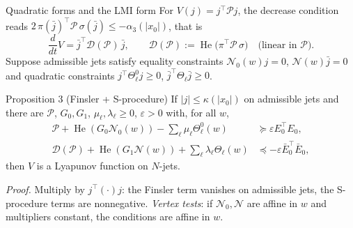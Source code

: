\documentclass[10pt,aspectratio=169]{beamer}
\newcommand{\tr}{^{\top}}
\newcommand{\PP}{\mathcal{P}}
\newcommand{\DD}{\mathcal{D}}
\newcommand{\NN}{\mathcal{N}}
\DeclareMathOperator{\He}{He}
\begin{document}
\begin{frame}{Quadratic forms and the LMI form}
For $V(j)=j\tr\PP j$, the decrease condition reads $2\,\pi(\bar j)\tr\PP\,\sigma(\bar j)\le-\alpha_3(|x_0|)$, that is
\[
\frac{d}{dt}V=\bar j\tr\DD(\PP)\,\bar j,\qquad \DD(\PP):=\He\big(\pi\tr\PP\,\sigma\big)\quad\text{(linear in }\PP).
\]
Suppose admissible jets satisfy equality constraints $\NN_0(w)j=0$, $\NN(w)\bar j=0$ and quadratic constraints $j\tr\Theta^0_\ell j\ge0$, $\bar j\tr\Theta_\ell \bar j\ge0$.
\begin{block}{Proposition 3 (Finsler + S-procedure)}
If $|j|\le\kappa(|x_0|)$ on admissible jets and there are $\PP$, $G_0,G_1$, $\mu_\ell,\lambda_\ell\ge0$, $\varepsilon>0$ with, for all $w$,
\begin{align*}
\PP+\He(G_0\NN_0(w))-\textstyle\sum_\ell\mu_\ell\Theta^0_\ell(w)&\succeq\varepsilon E_0\tr E_0,\\
\DD(\PP)+\He(G_1\NN(w))+\textstyle\sum_\ell\lambda_\ell\Theta_\ell(w)&\preceq-\varepsilon \bar E_0\tr\bar E_0,
\end{align*}
then $V$ is a Lyapunov function on $N$-jets.
\end{block}
\emph{Proof.} Multiply by $j\tr(\cdot)j$: the Finsler term vanishes on admissible jets, the S-procedure terms are nonnegative. \quad
\emph{Vertex tests}: if $\NN_0,\NN$ are affine in $w$ and multipliers constant, the conditions are affine in $w$.
\end{frame}
\end{document}
